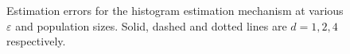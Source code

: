 \documentclass[12pt]{article}
\renewcommand{\epsilon}{\varepsilon}
\begin{document}
\begin{description}
\begin{figure}
{        }
        \caption{Estimation errors for the histogram estimation mechanism at various $\epsilon$ and population sizes. Solid, dashed and dotted lines are $d=1,2,4$ respectively.}
        \label{fig:histogram_errors}
    \end{figure}
    
    
    

\end{description}
\end{document}
